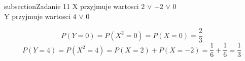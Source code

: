 subsection{Zadanie 11}
X  przyjmuje  wartosci  $2$  $\vee$  $-2$  $\vee$  $0$\\
Y  przyjmuje wartosci $4$ $\vee$ $0$

$$
P(Y = 0) = P(X^2 = 0) = P(X = 0) = \frac{2}{3}
$$
$$
P(Y = 4) = P(X^2 = 4) = P (X = 2) + P(X = -2) = \frac{1}{6} + \frac{1}{6} = \frac{1}{3}
$$
